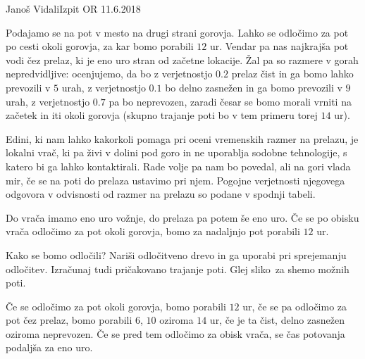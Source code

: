 \begin{naloga}{Janoš Vidali}{Izpit OR 11.6.2018}
\begin{vprasanje}
Podajamo se na pot v mesto na drugi strani gorovja.
Lahko se odločimo za pot po cesti okoli gorovja,
za kar bomo porabili $12$ ur.
Vendar pa nas najkrajša pot vodi čez prelaz,
ki je eno uro stran od začetne lokacije.
Žal pa so razmere v gorah nepredvidljive:
ocenjujemo, da bo z verjetnostjo $0.2$ prelaz čist
in ga bomo lahko prevozili v $5$ urah,
z ve\-rjet\-nost\-jo $0.1$ bo delno zasnežen in ga bomo prevozili v $9$ urah,
z verjetnostjo $0.7$ pa bo neprevozen,
zaradi česar se bomo morali vrniti na začetek in iti okoli gorovja
(skupno trajanje poti bo v tem primeru torej $14$ ur).

Edini, ki nam lahko kakorkoli pomaga pri oceni vremenskih razmer na prelazu,
je lokalni vrač,
ki pa živi v dolini pod goro in ne uporablja sodobne tehnologije,
s katero bi ga lahko kontaktirali.
Rade volje pa nam bo povedal, ali na gori vlada mir,
če se na poti do prelaza ustavimo pri njem.
Pogojne verjetnosti njegovega odgovora v odvisnosti od razmer na prelazu
so podane v spodnji tabeli.
\begin{center}
\end{center}
Do vrača imamo eno uro vožnje, do prelaza pa potem še eno uro.
Če se po obisku vrača odločimo za pot okoli gorovja,
bomo za nadaljnjo pot porabili $12$ ur.

Kako se bomo odločili?
Nariši odločitveno drevo in ga uporabi pri sprejemanju odločitev.
Izračunaj tudi pričakovano trajanje poti.
Glej sliko~\fig za shemo možnih poti.

\begin{slika}
\pgfslika
{}
\end{slika}
\end{vprasanje}

\begin{odgovor}
Če se odločimo za pot okoli gorovja, bomo porabili $12$ ur,
če se pa odločimo za pot čez prelaz, bomo porabili $6$, $10$ oziroma $14$ ur,
če je ta čist, delno zasnežen oziroma neprevozen.
Če se pred tem odločimo za obisk vrača, se čas potovanja podaljša za eno uro.


\end{odgovor}
\end{naloga}
